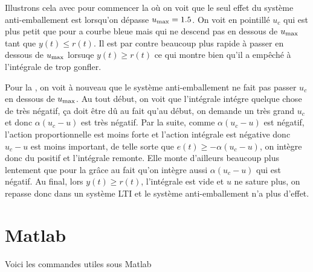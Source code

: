 Illustrons cela avec pour commencer la  où on voit que le seul effet du système anti-emballement est lorsqu'on dépasse
$u_\mathrm{max} = 1.5$.
On voit en pointillé $u_c$ qui est plus petit que pour a courbe bleue mais qui ne descend pas en dessous de $u_\mathrm{max}$ tant que $y(t) \leq r(t)$.
Il est par contre beaucoup plus rapide à passer en dessous de $u_\mathrm{max}$ lorsuqe $y(t) \geq r(t)$ ce qui montre bien qu'il a empêché à l'intégrale de trop gonfler.

Pour la , on voit à nouveau que le système anti-emballement ne fait pas passer $u_c$ en dessous de $u_\mathrm{max}$.
Au tout début, on voit que l'intégrale intégre quelque chose de très négatif, ça doit être dû au fait qu'au début, on demande un
très grand $u_c$ et donc $\alpha (u_c-u)$ est très négatif.
Par la suite, comme $\alpha(u_c-u)$ est négatif, l'action proportionnelle est moins forte et l'action intégrale est négative donc
$u_c - u$ est moins important, de telle sorte que $e(t) \geq -\alpha (u_c - u)$, on intègre donc du positif et l'intégrale remonte.
Elle monte d'ailleurs beaucoup plus lentement que pour la  grâce au fait qu'on intègre aussi $\alpha (u_c - u)$ qui
est négatif.
Au final, lors $y(t) \geq r(t)$, l'intégrale est vide et $u$ ne sature plus, on repasse donc dans un système LTI et le système
anti-emballement n'a plus d'effet.

\section{Matlab}
Voici les commandes utiles sous Matlab
